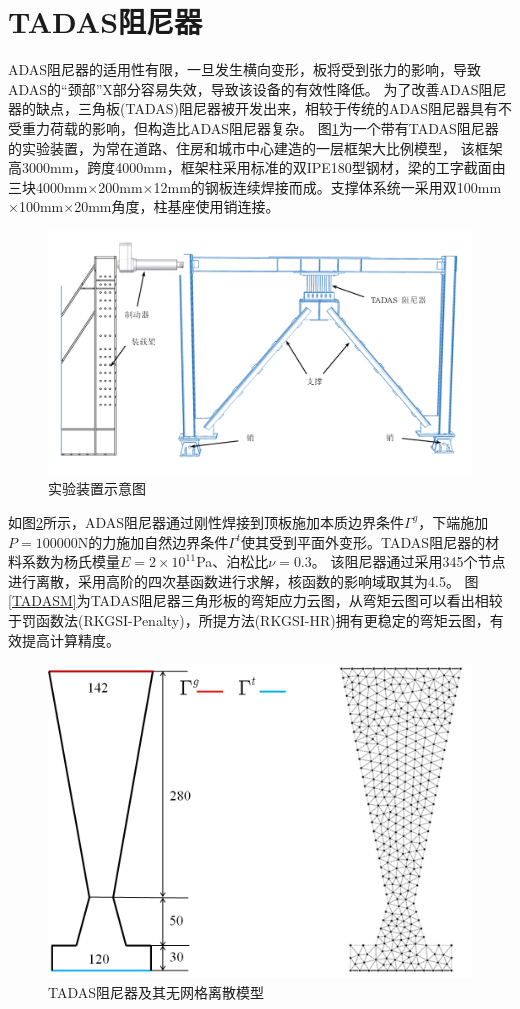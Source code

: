 \section{TADAS阻尼器}
ADAS阻尼器的适用性有限，一旦发生横向变形，板将受到张力的影响，导致ADAS的“颈部”X部分容易失效，导致该设备的有效性降低。
为了改善ADAS阻尼器的缺点，三角板(TADAS)阻尼器被开发出来，相较于传统的ADAS阻尼器具有不受重力荷载的影响，但构造比ADAS阻尼器复杂。
图\ref{TADAS1}为一个带有TADAS阻尼器的实验装置\cite{mohammadi2017}，为常在道路、住房和城市中心建造的一层框架大比例模型，
该框架高3000mm，跨度4000mm，框架柱采用标准的双IPE180型钢材，梁的工字截面由三块4000mm$\times$200mm$\times$12mm的钢板连续焊接而成。支撑体系统一采用双100mm$\times$100mm$\times$20mm角度，柱基座使用销连接。
\begin{figure}[H]
    \centering
    \includegraphics[scale=0.4]{figure/DAMPER/TADAS/1.png}
    \caption{实验装置示意图\cite{mohammadi2017}}\label{TADAS1}
\end{figure}
如图\ref{TADASmsh}所示，ADAS阻尼器通过刚性焊接到顶板施加本质边界条件$\Gamma^g$，下端施加$P=100000$N的力施加自然边界条件$\Gamma^t$使其受到平面外变形。TADAS阻尼器的材料系数为杨氏模量$E=2\times 10^{11}$Pa、泊松比$\nu=0.3$。
该阻尼器通过采用345个节点进行离散，采用高阶的四次基函数进行求解，核函数的影响域取其为4.5。
图\ref{TADASM}为TADAS阻尼器三角形板的弯矩应力云图，从弯矩云图可以看出相较于罚函数法(RKGSI-Penalty)，所提方法(RKGSI-HR)拥有更稳定的弯矩云图，有效提高计算精度。
\begin{figure}[H]
    \centering
    \includegraphics[scale=0.5]{figure/DAMPER/TADAS/TADAS dampers_msh.png}
    \caption{TADAS阻尼器及其无网格离散模型}\label{TADASmsh}
\end{figure}
